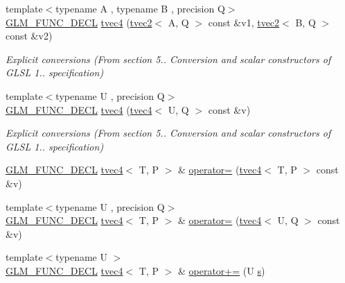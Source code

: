 \begin{DoxyCompactItemize}
{\footnotesize template$<$typename A , typename B , precision Q$>$ }\\\hyperlink{setup_8hpp_ab2d052de21a70539923e9bcbf6e83a51}{G\+L\+M\+\_\+\+F\+U\+N\+C\+\_\+\+D\+E\+CL} \hyperlink{structglm_1_1detail_1_1tvec4_a1aa94df5eda41024d31fb335a3a14026}{tvec4} (\hyperlink{structglm_1_1detail_1_1tvec2}{tvec2}$<$ A, Q $>$ const \&v1, \hyperlink{structglm_1_1detail_1_1tvec2}{tvec2}$<$ B, Q $>$ const \&v2)
\begin{DoxyCompactList}\small\item\em Explicit conversions (From section 5.. Conversion and scalar constructors of G\+L\+SL 1.. specification) \end{DoxyCompactList}\item 
{\footnotesize template$<$typename U , precision Q$>$ }\\\hyperlink{setup_8hpp_ab2d052de21a70539923e9bcbf6e83a51}{G\+L\+M\+\_\+\+F\+U\+N\+C\+\_\+\+D\+E\+CL} \hyperlink{structglm_1_1detail_1_1tvec4_ad57045d32f9c47a4afbb3d7524fe24ee}{tvec4} (\hyperlink{structglm_1_1detail_1_1tvec4}{tvec4}$<$ U, Q $>$ const \&v)
\begin{DoxyCompactList}\small\item\em Explicit conversions (From section 5.. Conversion and scalar constructors of G\+L\+SL 1.. specification) \end{DoxyCompactList}\item 
\hyperlink{setup_8hpp_ab2d052de21a70539923e9bcbf6e83a51}{G\+L\+M\+\_\+\+F\+U\+N\+C\+\_\+\+D\+E\+CL} \hyperlink{structglm_1_1detail_1_1tvec4}{tvec4}$<$ T, P $>$ \& \hyperlink{structglm_1_1detail_1_1tvec4_abafc0f4531b7d93b50e63bcdf9bcbf97}{operator=} (\hyperlink{structglm_1_1detail_1_1tvec4}{tvec4}$<$ T, P $>$ const \&v)
\item 
{\footnotesize template$<$typename U , precision Q$>$ }\\\hyperlink{setup_8hpp_ab2d052de21a70539923e9bcbf6e83a51}{G\+L\+M\+\_\+\+F\+U\+N\+C\+\_\+\+D\+E\+CL} \hyperlink{structglm_1_1detail_1_1tvec4}{tvec4}$<$ T, P $>$ \& \hyperlink{structglm_1_1detail_1_1tvec4_a9fc0189acf6230da54693f07ff80d4e7}{operator=} (\hyperlink{structglm_1_1detail_1_1tvec4}{tvec4}$<$ U, Q $>$ const \&v)
\item 
{\footnotesize template$<$typename U $>$ }\\\hyperlink{setup_8hpp_ab2d052de21a70539923e9bcbf6e83a51}{G\+L\+M\+\_\+\+F\+U\+N\+C\+\_\+\+D\+E\+CL} \hyperlink{structglm_1_1detail_1_1tvec4}{tvec4}$<$ T, P $>$ \& \hyperlink{structglm_1_1detail_1_1tvec4_a2698ceff8c17d81e180dfd6dd2f7031e}{operator+=} (U \hyperlink{structglm_1_1detail_1_1tvec4_a82cbced4cbd070056c5acbc1d4d4906f}{s})

\end{DoxyCompactItemize}
